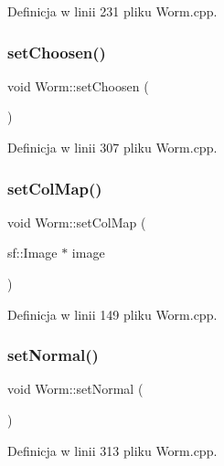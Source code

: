 Definicja w linii 231 pliku Worm.\+cpp.

\mbox{\label{class_worm_ac5daf6e0926f483415886c5ae297714a}} 
\subsubsection{\texorpdfstring{set\+Choosen()}{setChoosen()}}
{\footnotesize\ttfamily void Worm\+::set\+Choosen (\begin{DoxyParamCaption}{ }\end{DoxyParamCaption})}



Definicja w linii 307 pliku Worm.\+cpp.

\mbox{\label{class_worm_af851e558c46b33b245b96a43bb2e5c56}} 
\subsubsection{\texorpdfstring{set\+Col\+Map()}{setColMap()}}
{\footnotesize\ttfamily void Worm\+::set\+Col\+Map (\begin{DoxyParamCaption}\item[{sf\+::\+Image $\ast$}]{image }\end{DoxyParamCaption})}



Definicja w linii 149 pliku Worm.\+cpp.

\mbox{\label{class_worm_ab316cd13ecdfe9696e28687bfce47a4c}} 
\subsubsection{\texorpdfstring{set\+Normal()}{setNormal()}}
{\footnotesize\ttfamily void Worm\+::set\+Normal (\begin{DoxyParamCaption}{ }\end{DoxyParamCaption})}



Definicja w linii 313 pliku Worm.\+cpp.

\mbox{\label{class_worm_a8eb6b3e55c2e6cb7c87b1593f34dac52}} 
